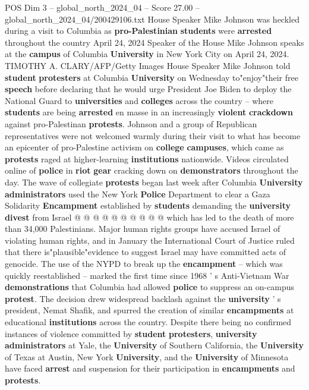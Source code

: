 \begin{textsample}{POS Dim 3 – global\_north\_2024\_04 – Score 27.00 – global\_north\_2024\_04/200429106.txt}  \label{ex:f3_pos_072}
House Speaker Mike Johnson was heckled during a visit to Columbia as \textbf{pro-Palestinian} \textbf{students} were \textbf{arrested} throughout the country April 24, 2024 Speaker of the House Mike Johnson speaks at the \textbf{campus} of Columbia \textbf{University} in New York City on April 24, 2024.
TIMOTHY A.
CLARY/AFP/Getty Images House Speaker Mike Johnson told \textbf{student} \textbf{protesters} at Columbia \textbf{University} on Wednesday to"enjoy"their free \textbf{speech} before declaring that he would urge President Joe Biden to deploy the National Guard to \textbf{universities} and \textbf{colleges} across the country -- where \textbf{students} are being \textbf{arrested} en masse in an increasingly \textbf{violent} \textbf{crackdown} against pro-Palestinan \textbf{protests}.
Johnson and a group of Republican representatives were not welcomed warmly during their visit to what has become an epicenter of pro-Palestine activism on \textbf{college} \textbf{campuses}, which came as \textbf{protests} raged at higher-learning \textbf{institutions} nationwide.
Videos circulated online of \textbf{police} in \textbf{riot} \textbf{gear} cracking down on \textbf{demonstrators} throughout the day.
The wave of collegiate \textbf{protests} began last week after Columbia \textbf{University} \textbf{administrators} used the New York \textbf{Police} Department to clear a Gaza Solidarity \textbf{Encampment} established by \textbf{students} demanding the \textbf{university} \textbf{divest} from Israel @ @ @ @ @ @ @ @ @ @ which has led to the death of more than 34,000 Palestinians.
Major human rights groups have accused Israel of violating human rights, and in January the International Court of Justice ruled that there is"plausible"evidence to suggest Israel may have committed acts of genocide.
The use of the NYPD to break up the \textbf{encampment} -- which was quickly reestablished -- marked the first time since 1968 ' s Anti-Vietnam War \textbf{demonstrations} that Columbia had allowed \textbf{police} to suppress an on-campus \textbf{protest}.
The decision drew widespread backlash against the \textbf{university} ' s president, Nemat Shafik, and spurred the creation of similar \textbf{encampments} at educational \textbf{institutions} across the country.
Despite there being no confirmed instances of violence committed by \textbf{student} \textbf{protesters}, \textbf{university} \textbf{administrators} at Yale, the \textbf{University} of Southern California, the \textbf{University} of Texas at Austin, New York \textbf{University}, and the \textbf{University} of Minnesota have faced \textbf{arrest} and suspension for their participation in \textbf{encampments} and \textbf{protests}.

\end{textsample}
